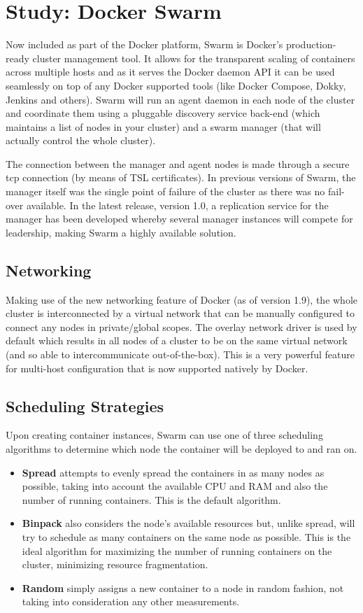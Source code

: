 \documentclass{article}
\begin{document}
\section{Study: Docker Swarm}
Now included as part of the Docker platform, Swarm is Docker's production-ready cluster management tool. It allows for the transparent scaling of containers across multiple hosts and as it serves the Docker daemon API it can be used seamlessly on top of any Docker supported tools (like Docker Compose, Dokky, Jenkins and others).
Swarm will run an agent daemon in each node of the cluster and coordinate them using a pluggable discovery service back-end (which maintains a list of nodes in your cluster) and a swarm manager (that will actually control the whole cluster).
\par
The connection between the manager and agent nodes is made through a secure tcp connection (by means of TSL certificates).
In previous versions of Swarm, the manager itself was the single point of failure of the cluster as there was no fail-over available.
In the latest release, version 1.0, a replication service for the manager has been developed whereby several manager instances will compete for leadership, making Swarm a highly available solution.
\subsection{Networking}
Making use of the new networking feature of Docker (as of version 1.9), the whole cluster is interconnected by a virtual network that can be manually configured to connect any nodes in private/global scopes. The overlay network driver is used by default which results in all nodes of a cluster to be on the same virtual network (and so able to intercommunicate out-of-the-box). This is a very powerful feature for multi-host configuration that is now supported natively by Docker.
\subsection{Scheduling Strategies}
Upon creating container instances, Swarm can use one of three scheduling algorithms to determine which node the container will be deployed to and ran on.
\begin{itemize}
\item \textbf{Spread} attempts to evenly spread the containers in as many nodes as possible, taking into account the available CPU and RAM and also the number of running containers. This is the default algorithm.
\item \textbf{Binpack} also considers the node's available resources but, unlike spread, will try to schedule as many containers on the same node as possible. This is the ideal algorithm for maximizing the number of running containers on the cluster, minimizing resource fragmentation.
\item \textbf{Random} simply assigns a new container to a node in random fashion, not taking into consideration any other measurements.
\end{itemize}
\end{document}
